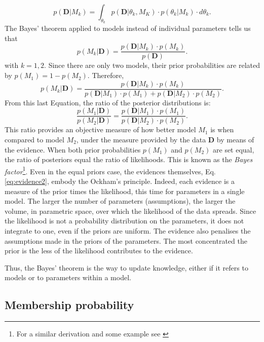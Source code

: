  \begin{equation}
p(\mathbf{D}|M_k)=\int_{\theta_k} p(\mathbf{D}|\theta_k,M_K)\cdot p(\theta_k|M_k)\cdot d\theta_k. \label{eq:evidence2}
\end{equation}
The Bayes' theorem applied to models instead of individual parameters tells us that
\begin{equation}
p(M_k|\mathbf{D})=\frac{p(\mathbf{D}|M_k)\cdot p(M_k)}{p(\mathbf{D})}.
\end{equation}
with $k=1,2$. Since there are only two models, their prior probabilities are related by $p(M_1)= 1- p(M_2)$. Therefore,
 \begin{equation}
p(M_k|\mathbf{D})=\frac{p(\mathbf{D}|M_k)\cdot p(M_k)}{p(\mathbf{D}|M_1)\cdot p(M_1)+p(\mathbf{D}|M_2)\cdot p(M_2)}.
\end{equation}
From this last Equation, the ratio of the posterior distributions is:
\begin{equation}
\frac{p(M_1|\mathbf{D})}{p(M_2|\mathbf{D})}=\frac{p(\mathbf{D}|M_1)\cdot p(M_1)}{p(\mathbf{D}|M_2)\cdot p(M_2)}.
\end{equation}
This ratio provides an objective measure of how better model $M_1$ is when compared to model $M_2$, under the measure provided by the data $\mathbf{D}$ by means of the evidence. When both prior probabilities  $p(M_1)$ and $p(M_2)$ are set equal, the ratio of posteriors equal the ratio of likelihoods. This is known as the \emph{Bayes factor}\footnote{For a similar derivation and some example see \citep{Kaas1995}}. Even in the equal priors case, the evidences themselves, Eq. \ref{eq:evidence2}, embody the Ockham's principle. Indeed, each evidence is a measure of the prior times the likelihood, this time for parameters in a single model. The larger the number of parameters (assumptions), the larger the volume, in parametric space, over which the likelihood of the data spreads. Since the likelihood is not a probability distribution on the parameters, it does not integrate to one, even if the priors are uniform. The evidence also penalises the assumptions made in the priors of the parameters. The most concentrated the prior is the less of the likelihood contributes to the evidence.

Thus, the Bayes' theorem is the way to update knowledge, either if it refers to models or to parameters within a model. 

\subsection{Membership probability}

